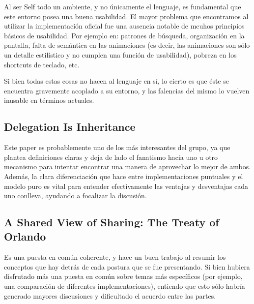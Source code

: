 \documentclass[a4paper,10pt]{article}
\begin{document}
Al ser Self todo un ambiente, y no únicamente el lenguaje, es fundamental que este entorno posea una buena usabilidad. El mayor problema que encontramos al utilizar la implementación oficial fue una ausencia notable de mcuhos principios básicos de usabilidad. Por ejemplo en: patrones de búsqueda, organización en la pantalla, falta de semántica en las animaciones (es decir, las animaciones son sólo un detalle estilístico y no cumplen una función de usabilidad), pobreza en los shortcuts de teclado, etc.

Si bien todas estas cosas no hacen al lenguaje en sí, lo cierto es que éste se encuentra gravemente acoplado a su entorno, y las falencias del mismo lo vuelven inusable en términos actuales.

\subsection{Delegation Is Inheritance}

Este paper es probablemente uno de los más interesantes del grupo, ya que plantea definiciones claras y deja de lado el fanatismo hacia uno u otro mecanismo para intentar encontrar una manera de aprovechar lo mejor de ambos. Además, la clara diferenciación que hace entre implementaciones puntuales y el modelo puro es vital para entender efectivamente las ventajas y desventajas cada uno conlleva, ayudando a focalizar la discusión.

\subsection{A Shared View of Sharing: The Treaty of Orlando}

Es una puesta en común coherente, y hace un buen trabajo al resumir los conceptos que hay detrás de cada postura que se fue presentando. Si bien hubiera disfrutado más una puesta en común sobre temas más específicos (por ejemplo, una comparación de diferentes implementaciones), entiendo que esto sólo habría generado mayores discusiones y dificultado el acuerdo entre las partes.


\printbibliography
\end{document}
